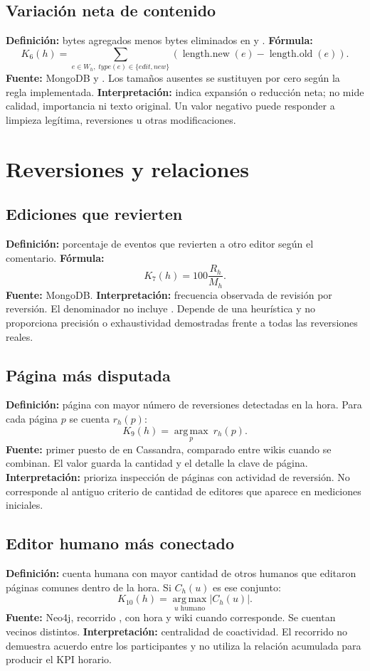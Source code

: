\subsection{Variación neta de contenido}
\textbf{Definición:} bytes agregados menos bytes eliminados en  y . \textbf{Fórmula:}
\[
K_6(h)=\sum_{e\in W_h,\;type(e)\in\{edit,new\}}
\left(\operatorname{length.new}(e)-\operatorname{length.old}(e)\right).
\]
\textbf{Fuente:} MongoDB y . Los tamaños ausentes se sustituyen por cero según la regla implementada. \textbf{Interpretación:} indica expansión o reducción neta; no mide calidad, importancia ni texto original. Un valor negativo puede responder a limpieza legítima, reversiones u otras modificaciones.

\section{Reversiones y relaciones}
\subsection{Ediciones que revierten}
\textbf{Definición:} porcentaje de eventos  que revierten a otro editor según el comentario. \textbf{Fórmula:}
\[
K_7(h)=100\frac{R_h}{M_h}.
\]
\textbf{Fuente:} MongoDB. \textbf{Interpretación:} frecuencia observada de revisión por reversión. El denominador no incluye . Depende de una heurística y no proporciona precisión o exhaustividad demostradas frente a todas las reversiones reales.

\subsection{Página más disputada}
\textbf{Definición:} página con mayor número de reversiones detectadas en la hora. Para cada página $p$ se cuenta $r_h(p)$:
\[
K_9(h)=\operatorname*{arg\,max}_{p}\ r_h(p).
\]
\textbf{Fuente:} primer puesto de  en Cassandra, comparado entre wikis cuando se combinan. El valor guarda la cantidad y el detalle la clave de página. \textbf{Interpretación:} prioriza inspección de páginas con actividad de reversión. No corresponde al antiguo criterio de cantidad de editores que aparece en mediciones iniciales.

\subsection{Editor humano más conectado}
\textbf{Definición:} cuenta humana con mayor cantidad de otros humanos que editaron páginas comunes dentro de la hora. Si $C_h(u)$ es ese conjunto:
\[
K_{10}(h)=\operatorname*{arg\,max}_{u\text{ humano}}|C_h(u)|.
\]
\textbf{Fuente:} Neo4j, recorrido , con hora y wiki cuando corresponde. Se cuentan vecinos distintos. \textbf{Interpretación:} centralidad de coactividad. El recorrido no demuestra acuerdo entre los participantes y no utiliza la relación acumulada  para producir el KPI horario.

